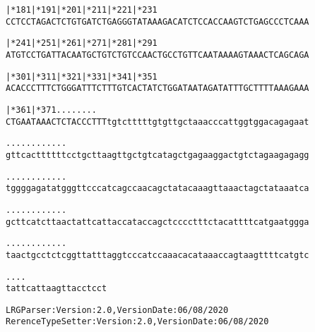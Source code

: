 \documentclass{article}
\begin{document}
\begin{alltt}
         |*181     |*191     |*201     |*211     |*221     |*231
CCTCCTAGACTCTGTGATCTGAGGGTATAAAGACATCTCCACCAAGTCTGAGCCCTCAAA



         |*241     |*251     |*261     |*271     |*281     |*291
ATGTCCTGATTACAATGCTGTCTGTCCAACTGCCTGTTCAATAAAAGTAAACTCAGCAGA



         |*301     |*311     |*321     |*331     |*341     |*351
ACACCCTTTCTGGGATTTCTTTGTCACTATCTGGATAATAGATATTTGCTTTTAAAGAAA



         |*361     |*371.    .    .    .    .    .    .    .
CTGAATAAACTCTACCCTTTtgtctttttgtgttgctaaacccattggtggacagagaat



    .    .    .    .    .    .    .    .    .    .    .    .
gttcacttttttcctgcttaagttgctgtcatagctgagaaggactgtctagaagagagg



    .    .    .    .    .    .    .    .    .    .    .    .
tggggagatatgggttcccatcagccaacagctatacaaagttaaactagctataaatca



    .    .    .    .    .    .    .    .    .    .    .    .
gcttcatcttaactattcattaccataccagctcccctttctacattttcatgaatggga



    .    .    .    .    .    .    .    .    .    .    .    .
taactgcctctcggttatttaggtcccatccaaacacataaaccagtaagttttcatgtc



    .    .    .    .
tattcattaagttacctcct


\end{alltt}
\newpage
\begin{alltt}
LRG Parser: Version: 2.0, Version Date: 06/08/2020
RerenceTypeSetter: Version: 2.0, Version Date: 06/08/2020
\end{alltt}
\end{document}
